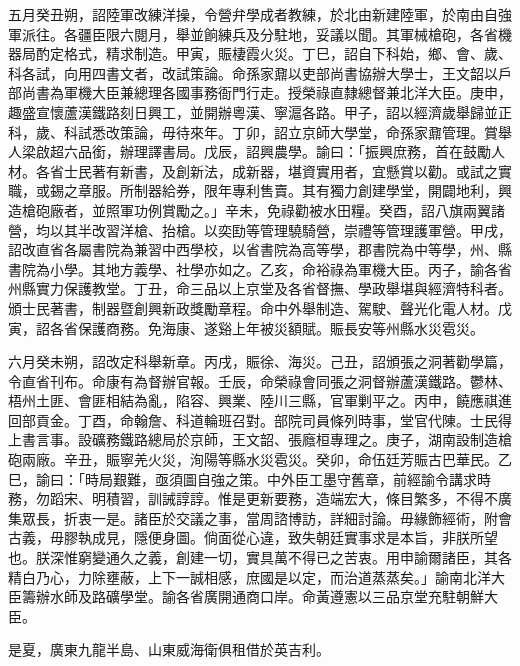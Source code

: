 \begin{pinyinscope}
五月癸丑朔，詔陸軍改練洋操，令營弁學成者教練，於北由新建陸軍，於南由自強軍派往。各疆臣限六閱月，舉並餉練兵及分駐地，妥議以聞。其軍械槍砲，各省機器局酌定格式，精求制造。甲寅，賑棲霞火災。丁巳，詔自下科始，鄉、會、歲、科各試，向用四書文者，改試策論。命孫家鼐以吏部尚書協辦大學士，王文韶以戶部尚書為軍機大臣兼總理各國事務衙門行走。授榮祿直隸總督兼北洋大臣。庚申，趣盛宣懷蘆漢鐵路刻日興工，並開辦粵漢、寧滬各路。甲子，詔以經濟歲舉歸並正科，歲、科試悉改策論，毋待來年。丁卯，詔立京師大學堂，命孫家鼐管理。賞舉人梁啟超六品銜，辦理譯書局。戊辰，詔興農學。諭曰：「振興庶務，首在鼓勵人材。各省士民著有新書，及創新法，成新器，堪資實用者，宜懸賞以勸。或試之實職，或錫之章服。所制器給券，限年專利售賣。其有獨力創建學堂，開闢地利，興造槍砲廠者，並照軍功例賞勵之。」辛未，免祿勸被水田糧。癸酉，詔八旗兩翼諸營，均以其半改習洋槍、抬槍。以奕劻等管理驍騎營，崇禮等管理護軍營。甲戌，詔改直省各屬書院為兼習中西學校，以省書院為高等學，郡書院為中等學，州、縣書院為小學。其地方義學、社學亦如之。乙亥，命裕祿為軍機大臣。丙子，諭各省州縣實力保護教堂。丁丑，命三品以上京堂及各省督撫、學政舉堪與經濟特科者。頒士民著書，制器暨創興新政獎勵章程。命中外舉制造、駕駛、聲光化電人材。戊寅，詔各省保護商務。免海康、遂谿上年被災額賦。賑長安等州縣水災雹災。

六月癸未朔，詔改定科舉新章。丙戌，賑徐、海災。己丑，詔頒張之洞著勸學篇，令直省刊布。命康有為督辦官報。壬辰，命榮祿會同張之洞督辦蘆漢鐵路。鬱林、梧州土匪、會匪相結為亂，陷容、興業、陸川三縣，官軍剿平之。丙申，饒應祺進回部貢金。丁酉，命翰詹、科道輪班召對。部院司員條列時事，堂官代陳。士民得上書言事。設礦務鐵路總局於京師，王文韶、張廕桓專理之。庚子，湖南設制造槍砲兩廠。辛丑，賑寧羌火災，洵陽等縣水災雹災。癸卯，命伍廷芳賑古巴華民。乙巳，諭曰：「時局艱難，亟須圖自強之策。中外臣工墨守舊章，前經諭令講求時務，勿蹈宋、明積習，訓誡諄諄。惟是更新要務，造端宏大，條目繁多，不得不廣集眾長，折衷一是。諸臣於交議之事，當周諮博訪，詳細討論。毋緣飾經術，附會古義，毋膠執成見，隱便身圖。倘面從心違，致失朝廷實事求是本旨，非朕所望也。朕深惟窮變通久之義，創建一切，實具萬不得已之苦衷。用申諭爾諸臣，其各精白乃心，力除壅蔽，上下一誠相感，庶國是以定，而治道蒸蒸矣。」諭南北洋大臣籌辦水師及路礦學堂。諭各省廣開通商口岸。命黃遵憲以三品京堂充駐朝鮮大臣。

是夏，廣東九龍半島、山東威海衛俱租借於英吉利。


\end{pinyinscope}

